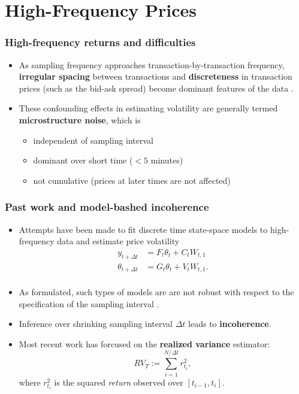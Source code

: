 \documentclass{beamer}
\begin{document}
\section{High-Frequency Prices}
\begin{frame}
  \frametitle{High-frequency returns and difficulties}
  \begin{itemize}
  \item As sampling frequency approaches transaction-by-transaction
    frequency, \textbf{irregular spacing} between transactions and 
    \textbf{discreteness} in transaction prices (such as the bid-ask
    spread) become dominant features of the data
    \citep{stoll2000presidential}.

  \item These confounding effects in estimating volatility are
    generally termed \textbf{microstructure noise}, which is

    \begin{itemize}
    \item independent of sampling interval
    \item dominant over short time ($<5$ minutes)
    \item not cumulative (prices at later times are not affected)
    \end{itemize}

  \end{itemize}
\end{frame}
\begin{frame}
  \frametitle{Past work and model-bashed incoherence}
  \begin{itemize}
  \item Attempts have been made to fit discrete time state-space
    models to high-frequency data and estimate price volatility
    \citep{bollerslev1986,andersen1997intraday}
    \begin{align*}
      y_{t+\Delta t} &= F_{t} \theta_t + C_t W_{t,1} \\
      \theta_{t+\Delta t} &= G_{t} \theta_t + V_t W_{t,1}. \\
    \end{align*}

  \item As formulated, such types of models are are not
    robust with respect to the specification of the sampling interval
    \citep{drost1993aggregation, andersen1997intraday,
      zumbach2000pitfalls}.

  \item Inference over shrinking sampling interval $\Delta t$ leads to
    \textbf{incoherence}.

  \item Most recent work has forcused on the \textbf{realized variance} \cite{comte1998long} estimator:
    \[
      RV_T := \sum_{i=1}^{N/\Delta t} r_{t_i}^2,
    \]
    where $r_{t_i}^2$ is the squared \textit{return} observed over $[t_{i-1}, t_i]$.
  \end{itemize}
\end{frame}
\end{document}
